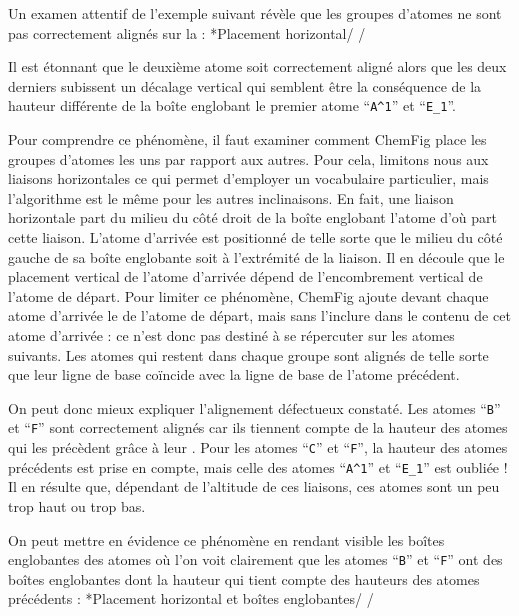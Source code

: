 \documentclass[10pt]{article}
\makeatletter
\newcommand\idx{\@ifstar{\let\print@or@not\@gobble\idx@}{\let\print@or@not\@firstofone\idx@}}
\newcommand\idx@[1]{%
	\ifcat\expandafter\noexpand\@car#1\@nil\relax%
		\expandafter\ifx\@car#1\@nil\protect
			\index{#1}%
			\print@or@not{#1}%
		\else
			\saveexpandmode\expandarg
			\StrSubstitute{\string#1}{\string @}{\@empty\protect\symbol{'100}}[\temp@]%
			\StrGobbleLeft\temp@1[\temp@]%
			\restoreexpandmode
			\expandafter\index\expandafter{\temp@ @\protect\texttt{\protect\textbackslash\temp@}}%
			\print@or@not{\texttt{\string#1}}%
		\fi
	\else
		\index{#1}%
		\print@or@not{#1}%
	\fi
}
\newcommand\make@car@active[2]{%
	\catcode`#1\active
	\begingroup
		\lccode`\~`#1\relax
		\lowercase{\endgroup\def~{#2}}%
}
\newif\if@exstar
\newcommand\exemple{%
	\begingroup
	\parskip\z@
	\@makeother\;\@makeother\!\@makeother\?\@makeother\:%
	\@ifstar{\@exstartrue\exemple@}{\@exstarfalse\exemple@}}
\newcommand\exemple@[2][65]{%
	\medbreak\noindent
	\begingroup
		\let\do\@makeother\dospecials
		\make@car@active\ { {}}%
		\make@car@active\^^M{\par\leavevmode}%
		\make@car@active\,{\leavevmode\kern\z@\string,}%
		\make@car@active\-{\leavevmode\kern\z@\string-}%
		\make@car@active\>{\leavevmode\kern\z@\string>}%
		\make@car@active\<{\leavevmode\kern\z@\string<}%
		\exemple@@{#1}{#2}%
}
\newcommand\exemple@@[3]{%
	\def\@tempa##1#3{\exemple@@@{#1}{#2}{##1}}%
	\@tempa
}
\newcommand\exemple@@@[3]{%
	\xdef\the@code{#3}%
	\endgroup
	\if@exstar
		\begingroup
			\fboxrule0.4pt
			\let\breakboxparindent\z@
			\def\bkvz@bottom{\hrule\@height\fboxrule}%
			\let\bkvz@before@breakbox\relax
			\def\bkvz@set@linewidth{\advance\linewidth\dimexpr-2\fboxrule-2\fboxsep}%
			\def\bkvz@left{\vrule\@width\fboxrule\hskip\fboxsep}%
			\def\bkvz@right{\hskip\fboxsep\vrule\@width\fboxrule}%
			\def\bkvz@top{\hbox to \hsize{%
				\vrule\@width\fboxrule\@height\fboxrule
				\leaders\bkvz@bottom\hfill
				\ECFAugie
				\fboxsep\z@
				\colorbox{black}{\kern0.25em\color{white}\footnotesize\lower0.5ex\hbox{\strut#2}\kern0.25em}%
				\leaders\bkvz@bottom\hfill
				\vrule\@width\fboxrule\@height\fboxrule}}%
			\breakbox
				\kern.5ex\relax
				\ttfamily\footnotesize\the@code\par
				\normalfont
				\kern3pt
				\hrule height0.1pt width\linewidth depth0.1pt
				\vskip5pt
				\rightskip0pt plus 1fill
				\everypar{{\color{lightgray}\rlap{\vrule height0.1pt width\linewidth depth0.1pt}}\hskip0pt plus 1fill}%
				\newlinechar`\^^M\everyeof{\noexpand}\scantokens{#3}\par
			\endbreakbox
		\endgroup
	\else
		\vskip0.5ex
		\boxput*(0,1)
			{\fboxsep\z@
			\hbox{\ECFAugie\colorbox{black}{\leavevmode\kern0.25em{\color{white}\footnotesize\strut#2}\kern0.25em}}%
			}%
			{\fboxsep5pt
			\fbox{%
				$\vcenter{\hsize\dimexpr0.#1\linewidth-\fboxsep-\fboxrule\relax
					\kern5pt\parskip0pt \ttfamily\footnotesize\the@code}%
				\vcenter{\kern5pt\hsize\dimexpr\linewidth-0.#1\linewidth-\fboxsep-\fboxrule\relax
					\everypar{{\color{lightgray}\rlap{\vrule height0.1pt width\dimexpr\linewidth-0.#1\linewidth-\fboxsep-\fboxrule depth0.1pt}}}%
					\footnotesize\newlinechar`\^^M\everyeof{\noexpand}\scantokens{#3}}$%
				}%
			}%
	\fi
	\medbreak
	\endgroup
}
\let\do\@makeother\dospecials
\newcommand\CF{{\ECFAugie ChemFig}\xspace}
\makeatother
\begin{document}
Un examen attentif de l'exemple suivant révèle que les groupes d'atomes ne sont pas correctement alignés sur la \idx{ligne de base} :
\exemple*{Placement horizontal}/\Huge\setatomsep{2em}
\qquad
{}/

Il est étonnant que le deuxième atome soit correctement aligné alors que les deux derniers subissent un décalage vertical qui semblent être la conséquence de la hauteur différente de la boîte englobant le premier atome ``\verb-A^1-'' et ``\verb-E_1-''.

Pour comprendre ce phénomène, il faut examiner comment \CF place les groupes d'atomes les uns par rapport aux autres. Pour cela, limitons nous aux liaisons horizontales ce qui permet d'employer un vocabulaire particulier, mais l'algorithme est le même pour les autres inclinaisons. En fait, une liaison horizontale part du milieu du côté droit de la boîte englobant l'atome d'où part cette liaison. L'atome d'arrivée est positionné de telle sorte que le milieu du côté gauche de sa boîte englobante soit à l'extrémité de la liaison. Il en découle que le placement vertical de l'atome d'arrivée dépend de l'encombrement vertical de l'atome de départ. Pour limiter ce phénomène, \CF ajoute devant chaque atome d'arrivée le \idx{\vphantom} de l'atome de départ, mais sans l'inclure dans le contenu de cet atome d'arrivée : ce \idx{\vphantom} n'est donc pas destiné à se répercuter sur les atomes suivants. Les atomes qui restent dans chaque groupe sont alignés de telle sorte que leur ligne de base coïncide avec la ligne de base de l'atome précédent.

On peut donc mieux expliquer l'alignement défectueux constaté. Les atomes ``\verb-B-'' et ``\verb-F-'' sont correctement alignés car ils tiennent compte de la hauteur des atomes qui les précèdent grâce à leur \idx\vphantom. Pour les atomes ``\verb-C-'' et ``\verb-F-'', la hauteur des atomes précédents est prise en compte, mais celle des atomes ``\verb-A^1-'' et ``\verb-E_1-'' est oubliée ! Il en résulte que, dépendant de l'altitude de ces liaisons, ces atomes sont un peu trop haut ou trop bas.

On peut mettre en évidence ce phénomène en rendant visible les boîtes englobantes des atomes où l'on voit clairement que les atomes ``\verb-B-'' et ``\verb-F-'' ont des boîtes englobantes dont la hauteur qui tient compte des hauteurs des atomes précédents :
\exemple*{Placement horizontal et boîtes englobantes}/\Huge\setatomsep{2em}
\fboxsep=0pt
\renewcommand\printatom[1]{\fbox{\ensuremath{\mathrm#1}}}
\qquad
{}/
\end{document}
